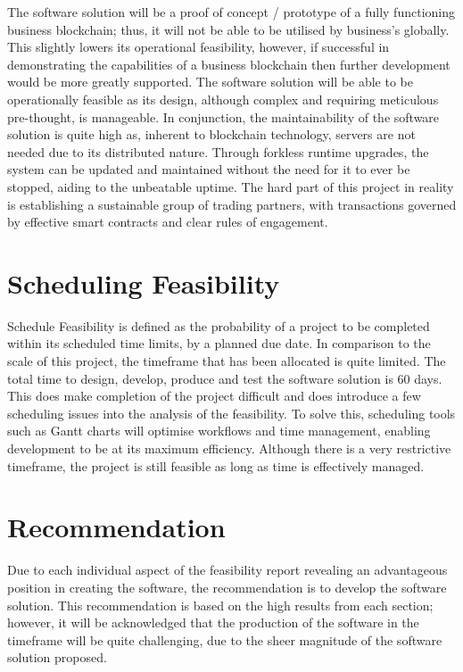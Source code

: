 The software solution will be a proof of concept / prototype of a fully functioning business blockchain; thus, it will not be able to be utilised by business's globally. This slightly lowers its operational feasibility, however, if successful in demonstrating the capabilities of a business blockchain then further development would be more greatly supported. The software solution will be able to be operationally feasible as its design, although complex and requiring meticulous pre-thought, is manageable. In conjunction, the maintainability of the software solution is quite high as, inherent to blockchain technology, servers are not needed due to its distributed nature. Through forkless runtime upgrades, the system can be updated and maintained without the need for it to ever be stopped, aiding to the unbeatable uptime. The hard part of this project in reality is establishing a sustainable group of trading partners, with transactions governed by effective smart contracts and clear rules of engagement. \\

\section{Scheduling Feasibility}

Schedule Feasibility is defined as the probability of a project to be completed within its scheduled time limits, by a planned due date. In comparison to the scale of this project, the timeframe that has been allocated is quite limited. The total time to design, develop, produce and test the software solution is 60 days. This does make completion of the project difficult and does introduce a few scheduling issues into the analysis of the feasibility. To solve this, scheduling tools such as Gantt charts will optimise workflows and time management, enabling development to be at its maximum efficiency. Although there is a very restrictive timeframe, the project is still feasible as long as time is effectively managed. \\

\section{Recommendation}

Due to each individual aspect of the feasibility report revealing an advantageous position in creating the software, the recommendation is to develop the software solution. This recommendation is based on the high results from each section; however, it will be acknowledged that the production of the software in the timeframe will be quite challenging, due to the sheer magnitude of the software solution proposed. \\



